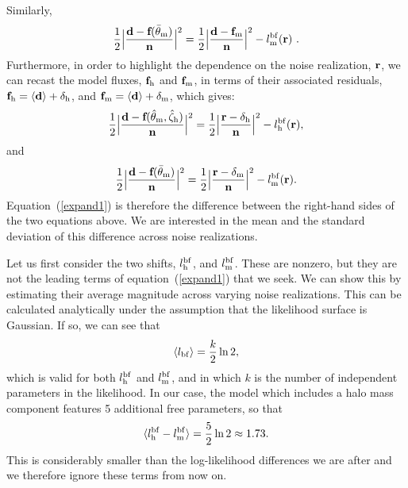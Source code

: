 \documentclass[a4paper, fleqn, usenatbib, useAMS]{mnras}
\def\zh{\zeta_{\rm h}}
\begin{document}
Similarly, 
%
\begin{equation}
{1\over 2} \Big|  {{{\textbf{d} - \textbf{f}(\bar\theta_{\rm m})}\over \bf n}} \Big|^2 = {1\over 2} \Big|  {{{\textbf{d} - \textbf{f}_{\rm m}}\over \bf n}} \Big|^2-l_{\rm m}^{\rm bf}(\textbf{r})\ .
\label{lbfshift2}
\end{equation}
%
Furthermore, in order to highlight the dependence on the noise realization, $\bf r$, we can recast the model fluxes, $\textbf{f}_{\rm h}$
 and $\textbf{f}_{\rm m}$, in terms of their associated residuals, $\textbf{f}_{\rm h} = \langle \textbf{d}\rangle+\delta_{\rm h}$, and $\textbf{f}_{\rm m}= \langle \textbf{d}\rangle+\delta_{\rm m}$, 
which gives:
%
\begin{equation}
{1\over 2} \Big|  {{{\textbf{d} - \textbf{f}(\hat\theta_{\rm m}, \hat\zh)}\over \bf n}} \Big|^2 = {1\over 2} \Big|  {{{\textbf{r} - {\delta}_{\rm h}}\over \bf n}} \Big|^2-l_{\rm h}^{\rm bf}(\textbf{r}),
\label{lbfshift1a}
\end{equation}
%
and 
%
\begin{equation}
{1\over 2} \Big|  {{{\textbf{d} - \textbf{f}(\bar\theta_{\rm m})}\over \bf n}} \Big|^2 = {1\over 2} \Big|  {{{\textbf{r} - {\delta}_{\rm m}}\over \bf n}} \Big|^2-l_{\rm m}^{\rm bf}(\textbf{r}).
\label{lbfshift2a}
\end{equation}
%
Equation~(\ref{expand1}) is therefore the difference between the
right-hand sides of the two equations  above. We are interested in the mean and the standard deviation of this difference across noise realizations. 

Let us first consider the two shifts, $l^{\rm bf}_{\rm h}$, and $l_{\rm m}^{\rm bf}$. These are nonzero, but they are not the leading terms of equation~(\ref{expand1}) that we seek. 
We can show this by estimating their average magnitude across varying
noise realizations. This can be calculated analytically under the assumption
that the likelihood surface is Gaussian. If so, we can see that 
%
\begin{equation}
\langle l_{\rm bf}\rangle = {k\over 2}\ln 2,
\label{lbfshift3}
\end{equation}
%
which is valid for both $l^{\rm bf}_{\rm h}$ and $l_{\rm m}^{\rm bf}$, and in which $k$ is the number of independent parameters in the likelihood. In our case, the model which 
includes a halo mass component features 5 additional free parameters, so that 
%
\begin{equation}
\langle l^{\rm bf}_{\rm h}-l^{\rm bf}_{\rm m}\rangle = {5\over 2}\ln 2 \approx 1.73.
\label{lbfshift4}
\end{equation}
%
This is considerably smaller than the log-likelihood differences we are after and we therefore ignore these terms from now on.
\end{document}
